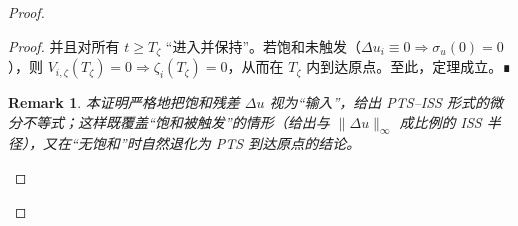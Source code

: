 \documentclass[pdflatex,sn-mathphys-num]{sn-jnl}%
\theoremstyle{thmstyleone}%
\newtheorem{theorem}{Theorem}%
\theoremstyle{thmstyletwo}%
\newtheorem{remark}{Remark}%
\theoremstyle{thmstylethree}%
\begin{document}
\begin{proof}
\begin{proof}
	并且对所有 $t\ge T_\zeta$ “进入并保持”。若饱和未触发（$\Delta u_i\equiv0\Rightarrow \sigma_u(0)=0$），则 $V_{i,\zeta}(T_\zeta)=0\Rightarrow \zeta_i(T_\zeta)=0$，从而在 $T_\zeta$ 内到达原点。至此，定理成立。∎
	
	\begin{remark}
	本证明严格地把饱和残差 $\Delta u$ 视为“输入”，给出 PTS–ISS 形式的微分不等式；这样既覆盖“饱和被触发”的情形（给出与 $\|\Delta u\|_\infty$ 成比例的 ISS 半径），又在“无饱和”时自然退化为 PTS 到达原点的结论。
	\end{remark}
	
	\end{proof}
	



\end{proof}
\end{document}
